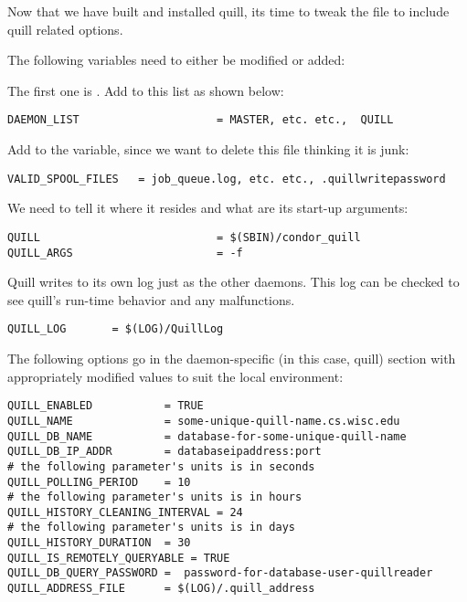 \begin{enumerate}
Now that we have built and installed quill, its time to tweak the 
 file to include quill related options.

The following variables need to either be modified or added:

The first one is .  Add  to this
list as shown below:

\begin{verbatim}
DAEMON_LIST                     = MASTER, etc. etc.,  QUILL
\end{verbatim}

Add  to the 
variable, since we  want  to delete this file
thinking it is junk:

\begin{verbatim}
VALID_SPOOL_FILES	= job_queue.log, etc. etc., .quillwritepassword
\end{verbatim}

We need to tell it where it resides and what are its start-up arguments:
\begin{verbatim}
QUILL                           = $(SBIN)/condor_quill
QUILL_ARGS                      = -f
\end{verbatim}

Quill writes to its own log just as the other daemons.  This log can be 
checked to see quill's run-time behavior and any malfunctions.
\begin{verbatim}
QUILL_LOG       = $(LOG)/QuillLog
\end{verbatim}

The following options go in the daemon-specific (in this case, quill) 
section with appropriately modified values to suit the local environment:

\begin{verbatim}
QUILL_ENABLED           = TRUE
QUILL_NAME              = some-unique-quill-name.cs.wisc.edu
QUILL_DB_NAME           = database-for-some-unique-quill-name
QUILL_DB_IP_ADDR        = databaseipaddress:port
# the following parameter's units is in seconds
QUILL_POLLING_PERIOD    = 10
# the following parameter's units is in hours
QUILL_HISTORY_CLEANING_INTERVAL = 24
# the following parameter's units is in days
QUILL_HISTORY_DURATION 	= 30
QUILL_IS_REMOTELY_QUERYABLE = TRUE
QUILL_DB_QUERY_PASSWORD =  password-for-database-user-quillreader
QUILL_ADDRESS_FILE      = $(LOG)/.quill_address
\end{verbatim}


\end{enumerate}
